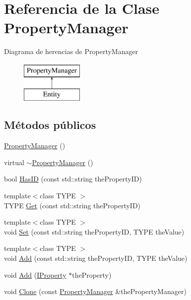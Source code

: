\hypertarget{classPropertyManager}{}\section{Referencia de la Clase Property\+Manager}
\label{classPropertyManager}
Diagrama de herencias de Property\+Manager\begin{figure}[H]
\begin{center}
\leavevmode
\includegraphics[height=2.000000cm]{classPropertyManager}
\end{center}
\end{figure}
\subsection*{Métodos públicos}
\begin{DoxyCompactItemize}
\item 
\hyperlink{classPropertyManager_a3b65b75bae28db832e98a38aec5774c6}{Property\+Manager} ()
\item 
virtual \hyperlink{classPropertyManager_aa16d7f0cb2a2baaa3b3afbe6239aac39}{$\sim$\+Property\+Manager} ()
\item 
bool \hyperlink{classPropertyManager_a36a6ba03a959d55810edb07740be3eba}{Has\+I\+D} (const std\+::string the\+Property\+I\+D)
\item 
{\footnotesize template$<$class T\+Y\+P\+E $>$ }\\T\+Y\+P\+E \hyperlink{classPropertyManager_aee3e23bbb59187ab2a9ecf7befdb0959}{Get} (const std\+::string the\+Property\+I\+D)
\item 
{\footnotesize template$<$class T\+Y\+P\+E $>$ }\\void \hyperlink{classPropertyManager_ab7ce7dda72b81fab5a96c8a13a619c75}{Set} (const std\+::string the\+Property\+I\+D, T\+Y\+P\+E the\+Value)
\item 
{\footnotesize template$<$class T\+Y\+P\+E $>$ }\\void \hyperlink{classPropertyManager_adbe08543c7c5a20fa86a0b67c45172c8}{Add} (const std\+::string the\+Property\+I\+D, T\+Y\+P\+E the\+Value)
\item 
void \hyperlink{classPropertyManager_af6509e575d0cd677daf63cb909ed91c8}{Add} (\hyperlink{classIProperty}{I\+Property} $\ast$the\+Property)
\item 
void \hyperlink{classPropertyManager_a77dc4b4617d344aff0481cd8e1cecb39}{Clone} (const \hyperlink{classPropertyManager}{Property\+Manager} \&the\+Property\+Manager)
\end{DoxyCompactItemize}


